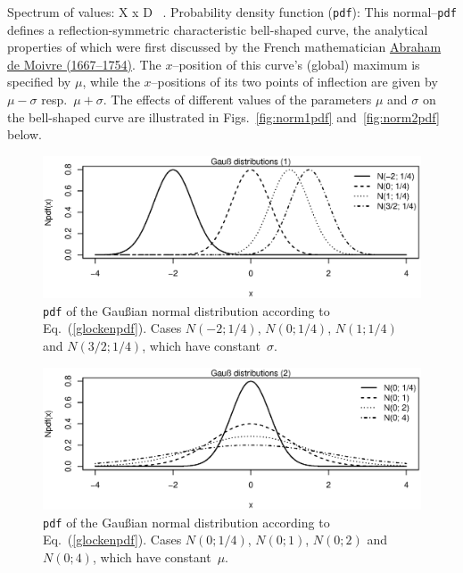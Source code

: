 \medskip
\noindent
Spectrum of values:
%
\be
X \mapsto x \in D \subseteq {} \ .
\ee
%
Probability density function (\texttt{pdf}):
%
\be
{}
\ee
%
This normal--\texttt{pdf} defines a reflection-symmetric 
characteristic bell-shaped curve, the analytical properties of 
which were first discussed by the French mathematician 
\href{http://www-history.mcs.st-and.ac.uk/Biographies/De_Moivre.html}{Abraham de Moivre (1667--1754)}. The $x$--position of this 
curve's (global) maximum is specified by $\mu$, while the 
$x$--positions of its two points of inflection are given by 
$\mu-\sigma$ resp.~$\mu+\sigma$. The effects of different values 
of the parameters $\mu$ and $\sigma$ on the bell-shaped curve are 
illustrated in Figs.~\ref{fig:norm1pdf} and~\ref{fig:norm2pdf}
below.
%
\begin{figure}[!htb]
\begin{center}
\includegraphics[scale=0.8]{norm1pdf.eps}
\end{center}
\caption{\texttt{pdf} of the Gau\ss ian normal distribution
according to Eq.~(\ref{glockenpdf}). Cases $N(-2;1/4)$,
$N(0;1/4)$, $N(1;1/4)$ and $N(3/2;1/4)$, which have
constant~$\sigma$.}
\end{figure}
%
%
\begin{figure}[!htb]
\begin{center}
\includegraphics[scale=0.8]{norm2pdf.eps}
\end{center}
\caption{\texttt{pdf} of the Gau\ss ian normal distribution
according to Eq.~(\ref{glockenpdf}). Cases $N(0;1/4)$, $N(0;1)$,
$N(0;2)$ and $N(0;4)$, which have constant~$\mu$.}
\end{figure}
%

